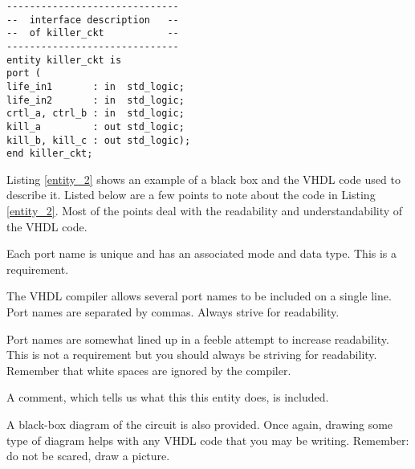 \noindent
\begin{minipage}{0.51\linewidth}
\vspace{5pt}
\begin{lstlisting}[label=entity_2, caption=VHDL entity declaration.]
------------------------------
--  interface description   --
--  of killer_ckt           --
------------------------------
entity killer_ckt is
port (
life_in1       : in  std_logic;
life_in2       : in  std_logic;
crtl_a, ctrl_b : in  std_logic;
kill_a         : out std_logic;
kill_b, kill_c : out std_logic);
end killer_ckt;
\end{lstlisting}
\end{minipage}
\begin{minipage}{0.49\linewidth}
\begin{flushright}
\end{flushright}
\end{minipage}

Listing \ref{entity_2} shows an example of a black box and the VHDL code used to describe it. Listed below are a few points to note about the code in Listing \ref{entity_2}. Most of the points deal with the readability and understandability of the VHDL code.

\begin{my_list}
\item Each port name is unique and has an associated mode and data type. This is a requirement.
\item The VHDL compiler allows several port names to be included on a single line. Port names are separated by commas. Always strive for readability.
\item Port names are somewhat lined up in a feeble attempt to increase readability. This is not a requirement but you should always be striving for readability. Remember that white spaces are ignored by the compiler.
\item A comment, which tells us what this this entity does, is included.
\item A black-box diagram of the circuit is also provided. Once again, drawing some type of diagram helps with any VHDL code that you may be writing. Remember: do not be scared, draw a picture.
\end{my_list}

